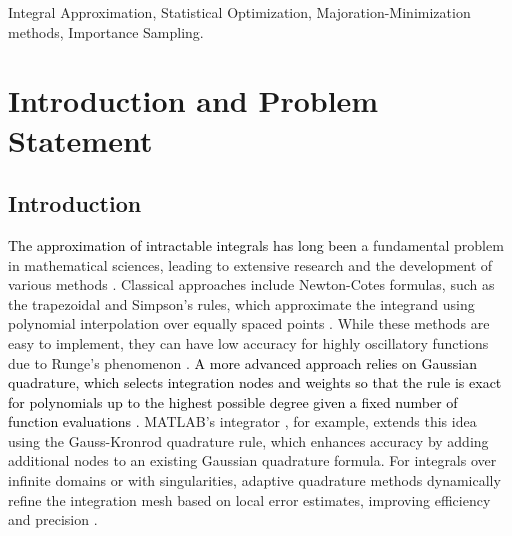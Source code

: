 \documentclass[review]{elsarticle}
\newcommand{\cblue}{\textcolor{black}}
\begin{document}
\begin{frontmatter}
\begin{abstract}
In this paper, we focus on the integration problem arising in the estimation of moments of scalar unnormalized distributions. We introduce a sequential method for constructing upper and lower bounds on the sought integral. Our approach leverages the majorization-minimization framework to iteratively refine these bounds  using an envelope principle. The method has proven convergence and controlled accuracy under mild conditions. \cblue{We then generalize the method to the multi-dimensional setting, along with an effective implementation strategy based on power diagrams.} We demonstrate \cblue{the effectiveness of the proposed approach} through a detailed numerical example of the estimation of a Monte Carlo sampler variance in a Bayesian inference problem, \cblue{in one- and two-dimensional     cases}. 
\end{abstract}
 
\begin{keyword}
Integral Approximation, Statistical Optimization, Majoration-Minimization methods, Importance Sampling.
\end{keyword}

\end{frontmatter}


\newpage


\section{Introduction and Problem Statement}
\label{sec_problem}
\subsection{Introduction}

\cblue{The approximation of intractable integrals has long been} a fundamental problem in mathematical sciences, leading to extensive research and the development of various methods \cite{Robert04,liu2001monte,krylov2006approximate}. Classical approaches include Newton-Cotes formulas, such as the trapezoidal and Simpson’s rules, which approximate the integrand using polynomial interpolation over equally spaced points \cite{DavisRabinowitz1984}. While these methods are easy to implement, they can have low accuracy for highly oscillatory functions due to Runge’s phenomenon \cite{Demailly2006}. \cblue{A more advanced approach relies on Gaussian quadrature, which selects integration nodes and weights so that the rule is exact for polynomials up to the highest possible degree given a fixed number of function evaluations \cite{brass2011quadrature,elvira2020importance}.} MATLAB’s integrator \cite{MATLAB_integral}, for example, extends this idea using the Gauss-Kronrod quadrature rule, which enhances accuracy by adding additional nodes to an existing Gaussian quadrature formula. For integrals over infinite domains or with singularities, adaptive quadrature methods dynamically refine the integration mesh based on local error estimates, improving efficiency and precision \cite{KahanerMolertNash1989}.
\end{document}

